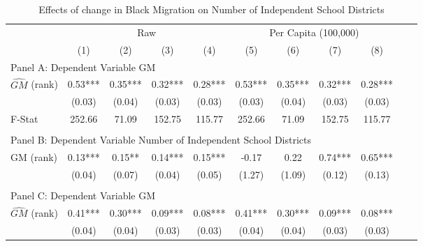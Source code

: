  \begin{table}[htbp]\centering {} \begin{threeparttable} \caption{Effects of change in Black Migration on Number of Independent School Districts} \begin{tabular}{l*{10}{c}} \toprule
                &\multicolumn{4}{c}{Raw}                                    &\multicolumn{4}{c}{Per Capita (100,000)}                   \\\cmidrule(lr){2-5}\cmidrule(lr){6-9}
                &\multicolumn{1}{c}{(1)}   &\multicolumn{1}{c}{(2)}   &\multicolumn{1}{c}{(3)}   &\multicolumn{1}{c}{(4)}   &\multicolumn{1}{c}{(5)}   &\multicolumn{1}{c}{(6)}   &\multicolumn{1}{c}{(7)}   &\multicolumn{1}{c}{(8)}   \\
\cmidrule(lr){1-9}
\multicolumn{8}{l}{Panel A: Dependent Variable GM}\\
\cmidrule(lr){1-9}
$\hat{GM}$ (rank)&       0.53***&       0.35***&       0.32***&       0.28***&       0.53***&       0.35***&       0.32***&       0.28***\\
                &     (0.03)   &     (0.04)   &     (0.03)   &     (0.03)   &     (0.03)   &     (0.04)   &     (0.03)   &     (0.03)   \\
\midrule
F-Stat          &     252.66   &      71.09   &     152.75   &     115.77   &     252.66   &      71.09   &     152.75   &     115.77   \\
\cmidrule[\heavyrulewidth](lr){1-9} \\ \cmidrule[\heavyrulewidth](lr){1-9}
\multicolumn{8}{l}{Panel B: Dependent Variable Number of Independent School Districts}\\
\cmidrule(lr){1-9}
GM  (rank)      &       0.13***&       0.15** &       0.14***&       0.15***&      -0.17   &       0.22   &       0.74***&       0.65***\\
                &     (0.04)   &     (0.07)   &     (0.04)   &     (0.05)   &     (1.27)   &     (1.09)   &     (0.12)   &     (0.13)   \\
\cmidrule[\heavyrulewidth](lr){1-9} \\ \cmidrule[\heavyrulewidth](lr){1-9}
\multicolumn{8}{l}{Panel C: Dependent Variable GM}\\
\cmidrule(lr){1-9}
$\hat{GM}$ (rank)&       0.41***&       0.30***&       0.09***&       0.08***&       0.41***&       0.30***&       0.09***&       0.08***\\
                &     (0.04)   &     (0.04)   &     (0.03)   &     (0.03)   &     (0.04)   &     (0.04)   &     (0.03)   &     (0.03)   \\

\end{tabular}
\end{threeparttable}
\end{table}

